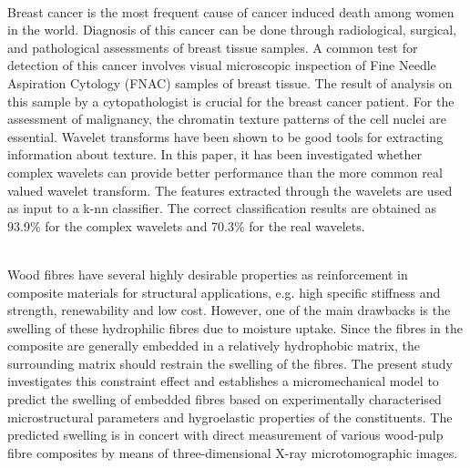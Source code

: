 {{\begin{enumerate}
\\ \aabstract
Breast cancer is the most frequent cause of cancer induced death among women in the world. Diagnosis of this cancer can be done through radiological, surgical, and pathological assessments of breast tissue samples. A common test for detection of this cancer involves visual microscopic inspection of Fine Needle Aspiration Cytology (FNAC) samples of breast tissue. The result of analysis on this sample by a cytopathologist is crucial for the breast cancer patient. For the assessment of malignancy, the chromatin texture patterns of the cell nuclei are essential. Wavelet transforms have been shown to be good tools for extracting information about texture. In this paper, it has been investigated whether complex wavelets can provide better performance than the more common real valued wavelet transform. The features extracted through the wavelets are used as input to a k-nn classifier. The correct classification results are obtained as 93.9\% for the complex wavelets and 70.3\% for the real wavelets.

\\ \aabstract
Wood fibres have several highly desirable properties as reinforcement in composite materials for structural applications, e.g. high specific stiffness and strength, renewability and low cost. However, one of the main drawbacks is the swelling of these hydrophilic fibres due to moisture uptake. Since the fibres in the composite are generally embedded in a relatively hydrophobic matrix, the surrounding matrix should restrain the swelling of the fibres. The present study investigates this constraint effect and establishes a micromechanical model to predict the swelling of embedded fibres based on experimentally characterised microstructural parameters and hygroelastic properties of the constituents. The predicted swelling is in concert with direct measurement of various wood-pulp fibre composites by means of three-dimensional X-ray microtomographic images.


\end{enumerate}}}
